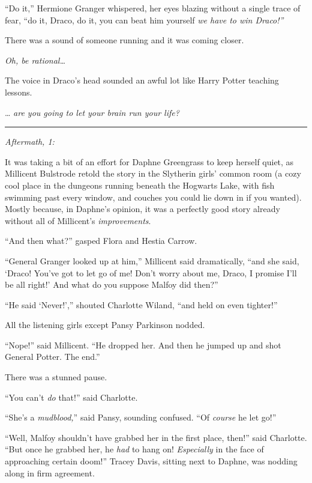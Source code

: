 ``Do it,'' Hermione Granger whispered, her eyes blazing without a single
trace of fear, ``do it, Draco, do it, you can beat him yourself \emph{we
have to win Draco!''}

There was a sound of someone running and it was coming closer.

\emph{Oh, be rational\ldots{}}

The voice in Draco's head sounded an awful lot like Harry Potter
teaching lessons.

\ldots{} \emph{are you going to let your brain run your life?}

\begin{center}\rule{3in}{0.4pt}\end{center}

\emph{Aftermath, 1:}

It was taking a bit of an effort for Daphne Greengrass to keep herself
quiet, as Millicent Bulstrode retold the story in the Slytherin girls'
common room (a cozy cool place in the dungeons running beneath the
Hogwarts Lake, with fish swimming past every window, and couches you
could lie down in if you wanted). Mostly because, in Daphne's opinion,
it was a perfectly good story already without all of Millicent's
\emph{improvements}.

``And then what?'' gasped Flora and Hestia Carrow.

``General Granger looked up at him,'' Millicent said dramatically, ``and
she said, `Draco! You've got to let go of me! Don't worry about me,
Draco, I promise I'll be all right!' And what do you suppose Malfoy did
then?''

``He said `Never!','' shouted Charlotte Wiland, ``and held on even
tighter!''

All the listening girls except Pansy Parkinson nodded.

``Nope!'' said Millicent. ``He dropped her. And then he jumped up and
shot General Potter. The end.''

There was a stunned pause.

``You can't \emph{do} that!'' said Charlotte.

``She's a \emph{mudblood,}'' said Pansy, sounding confused. ``Of
\emph{course} he let go!''

``Well, Malfoy shouldn't have grabbed her in the first place, then!''
said Charlotte. ``But once he grabbed her, he \emph{had} to hang on!
\emph{Especially} in the face of approaching certain doom!'' Tracey
Davis, sitting next to Daphne, was nodding along in firm agreement.


